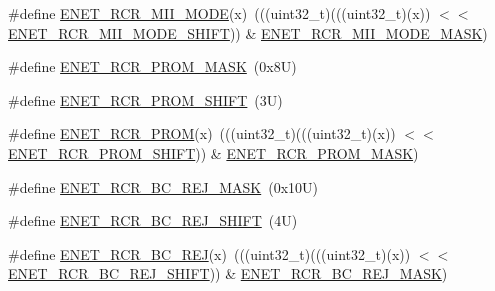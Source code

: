 \begin{DoxyCompactItemize}
\item 
\#define \mbox{\hyperlink{group___e_n_e_t___register___masks_gabdc716b11f1693c6abeb5c5d4b1a6a1e}{E\+N\+E\+T\+\_\+\+R\+C\+R\+\_\+\+M\+I\+I\+\_\+\+M\+O\+DE}}(x)~(((uint32\+\_\+t)(((uint32\+\_\+t)(x)) $<$$<$ \mbox{\hyperlink{group___e_n_e_t___register___masks_gaef1228d5d365350c81bf4bf641ad3dd4}{E\+N\+E\+T\+\_\+\+R\+C\+R\+\_\+\+M\+I\+I\+\_\+\+M\+O\+D\+E\+\_\+\+S\+H\+I\+FT}})) \& \mbox{\hyperlink{group___e_n_e_t___register___masks_ga117cf78ff620b783e4dc4156ad1a735b}{E\+N\+E\+T\+\_\+\+R\+C\+R\+\_\+\+M\+I\+I\+\_\+\+M\+O\+D\+E\+\_\+\+M\+A\+SK}})
\item 
\#define \mbox{\hyperlink{group___e_n_e_t___register___masks_gac7ad0640855d497207c29e8558341616}{E\+N\+E\+T\+\_\+\+R\+C\+R\+\_\+\+P\+R\+O\+M\+\_\+\+M\+A\+SK}}~(0x8\+U)
\item 
\#define \mbox{\hyperlink{group___e_n_e_t___register___masks_gabd47b61ac9aecad49dd266ff3421b98f}{E\+N\+E\+T\+\_\+\+R\+C\+R\+\_\+\+P\+R\+O\+M\+\_\+\+S\+H\+I\+FT}}~(3\+U)
\item 
\#define \mbox{\hyperlink{group___e_n_e_t___register___masks_gaa820472f1a85a26dea4bc3bfd3482208}{E\+N\+E\+T\+\_\+\+R\+C\+R\+\_\+\+P\+R\+OM}}(x)~(((uint32\+\_\+t)(((uint32\+\_\+t)(x)) $<$$<$ \mbox{\hyperlink{group___e_n_e_t___register___masks_gabd47b61ac9aecad49dd266ff3421b98f}{E\+N\+E\+T\+\_\+\+R\+C\+R\+\_\+\+P\+R\+O\+M\+\_\+\+S\+H\+I\+FT}})) \& \mbox{\hyperlink{group___e_n_e_t___register___masks_gac7ad0640855d497207c29e8558341616}{E\+N\+E\+T\+\_\+\+R\+C\+R\+\_\+\+P\+R\+O\+M\+\_\+\+M\+A\+SK}})
\item 
\#define \mbox{\hyperlink{group___e_n_e_t___register___masks_gaf7ca1d57cd7888b1cb6e0d6834eeba06}{E\+N\+E\+T\+\_\+\+R\+C\+R\+\_\+\+B\+C\+\_\+\+R\+E\+J\+\_\+\+M\+A\+SK}}~(0x10\+U)
\item 
\#define \mbox{\hyperlink{group___e_n_e_t___register___masks_gafbd6d9ebd1bfe9b4271864e5148765ba}{E\+N\+E\+T\+\_\+\+R\+C\+R\+\_\+\+B\+C\+\_\+\+R\+E\+J\+\_\+\+S\+H\+I\+FT}}~(4\+U)
\item 
\#define \mbox{\hyperlink{group___e_n_e_t___register___masks_ga4545a2dc63999b8d79dffecdba9694fe}{E\+N\+E\+T\+\_\+\+R\+C\+R\+\_\+\+B\+C\+\_\+\+R\+EJ}}(x)~(((uint32\+\_\+t)(((uint32\+\_\+t)(x)) $<$$<$ \mbox{\hyperlink{group___e_n_e_t___register___masks_gafbd6d9ebd1bfe9b4271864e5148765ba}{E\+N\+E\+T\+\_\+\+R\+C\+R\+\_\+\+B\+C\+\_\+\+R\+E\+J\+\_\+\+S\+H\+I\+FT}})) \& \mbox{\hyperlink{group___e_n_e_t___register___masks_gaf7ca1d57cd7888b1cb6e0d6834eeba06}{E\+N\+E\+T\+\_\+\+R\+C\+R\+\_\+\+B\+C\+\_\+\+R\+E\+J\+\_\+\+M\+A\+SK}})
\item 
$$
\end{DoxyCompactItemize}
